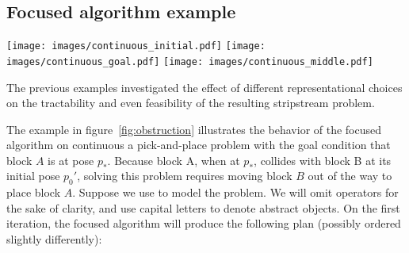 \documentclass[letterpaper]{article} %
\theoremstyle{plain}\newtheorem{thm}{Theorem}
\theoremstyle{definition}\newtheorem{defn}{Definition}
\theoremstyle{plain}\newtheorem{lem}{Lemma}
\theoremstyle{plain}\newtheorem{cor}{Corollary}
\newcommand{\algname}{{\sc strips}tream}
\newcommand{\focused}{focused}
\begin{document}
\subsection{Focused algorithm example}

\begin{figure*}[ht]
\centering
\texttt{[image: images/continuous\_initial.pdf]}
\texttt{[image: images/continuous\_goal.pdf]}
\texttt{[image: images/continuous\_middle.pdf]}
\caption{Initial state for countable pick-and-place problem requiring
  picking and placing block A, with a single obstacle.} 
\label{fig:obstruction}
\end{figure*}

The previous examples investigated the effect of different representational choices on the tractability and even feasibility of the resulting \algname{} problem. 



The example in figure~\ref{fig:obstruction} illustrates the behavior
of the focused algorithm on continuous a pick-and-place problem with the
goal condition that block $A$ is at pose $p_*$. Because block A, when
at $p_*$, collides with block B at its initial pose $p_0'$, solving
this problem requires
moving block $B$ out of the way to place block $A$. Suppose we use
 to model the problem.  We will omit  operators
for the sake of clarity,  and use capital letters to denote abstract
objects. On the first iteration, the \focused{} algorithm will produce the
following plan (possibly ordered slightly differently):
\end{document}
